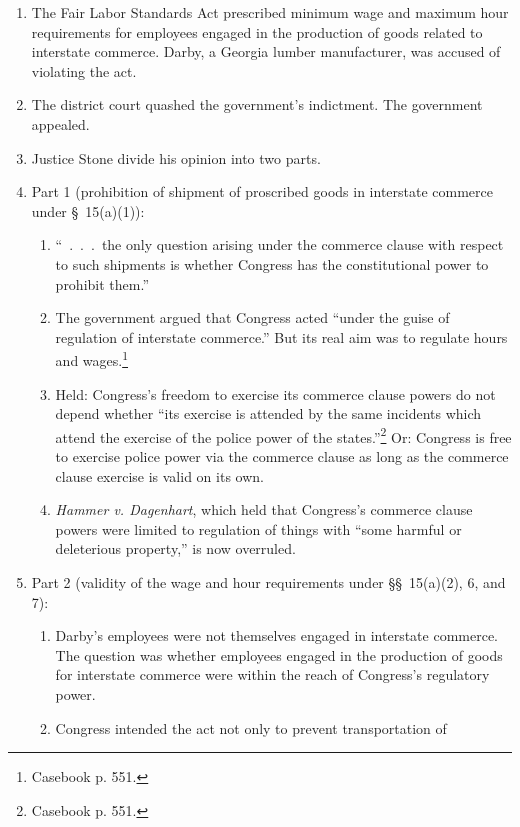 \begin{enumerate}
    \item The Fair Labor Standards Act prescribed minimum wage and maximum 
    hour requirements for employees engaged in the production of goods related 
    to interstate commerce. Darby, a Georgia lumber manufacturer, was accused 
    of violating the act.
    \item The district court quashed the government's indictment. The 
    government appealed.
    \item Justice Stone divide his opinion into two parts.
    \item Part 1 (prohibition of shipment of proscribed goods in interstate 
    commerce under \S\ 15(a)(1)):
    \begin{enumerate}
        \item ``~.~.~.~the only question arising under the commerce clause 
        with respect to such shipments is whether Congress has the 
        constitutional power to prohibit them.''
        \item The government argued that Congress acted ``under the guise of 
        regulation of interstate commerce.'' But its real aim was to regulate 
        hours and wages.\footnote{Casebook p. 551.}
        \item Held: Congress's freedom to exercise its commerce clause powers 
        do not depend whether ``its exercise is attended by the same incidents 
        which attend the exercise of the police power of the 
        states.''\footnote{Casebook p. 551.} Or: Congress is free to exercise 
        police power via the commerce clause as long as the commerce clause 
        exercise is valid on its own.
        \item \emph{Hammer v. Dagenhart}, which held that Congress's commerce 
        clause powers were limited to regulation of things with ``some harmful 
        or deleterious property,'' is now overruled.
    \end{enumerate}
    \item Part 2 (validity of the wage and hour requirements under \S\S\ 
    15(a)(2), 6, and 7):
    \begin{enumerate}
        \item Darby's employees were not themselves engaged in interstate 
        commerce. The question was whether employees engaged in the production 
        of goods for interstate commerce were within the reach of Congress's 
        regulatory power.
        \item Congress intended the act not only to prevent transportation of 

\end{enumerate}
\end{enumerate}
